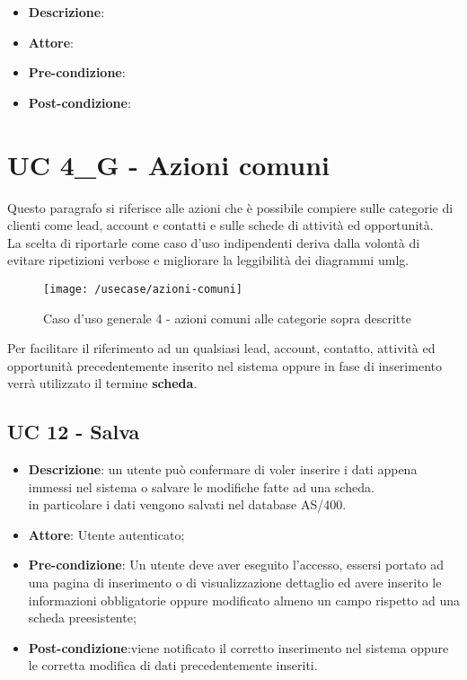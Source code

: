 \begin{itemize}
	\item \textbf{Descrizione}: %
	\item \textbf{Attore}: 
	\item \textbf{Pre-condizione}:
	\item \textbf{Post-condizione}:
\end{itemize}

\newpage

\section{UC 4\_G - Azioni comuni}

Questo paragrafo si riferisce alle azioni che è possibile compiere sulle categorie di clienti come lead, account e contatti e sulle schede di attività ed opportunità.\\
La scelta di riportarle come caso d'uso indipendenti deriva dalla volontà di evitare ripetizioni verbose e migliorare la leggibilità dei diagrammi \gls{umlg}.\\
\begin{figure}[h]
	\centering
	\texttt{[image: /usecase/azioni-comuni]}
	\caption{Caso d'uso generale 4 - azioni comuni alle categorie sopra descritte}
\end{figure}
Per facilitare il riferimento ad un qualsiasi lead, account, contatto, attività ed opportunità precedentemente inserito nel sistema oppure in fase di inserimento verrà utilizzato il termine \textbf{scheda}.
\subsection{UC 12 - Salva}

\begin{itemize}
	\item \textbf{Descrizione}: un utente può confermare di voler inserire i dati appena immessi nel sistema o salvare le modifiche fatte ad una scheda. \\
	 in particolare i dati vengono salvati nel database AS/400.
	\item \textbf{Attore}: Utente autenticato;
	\item \textbf{Pre-condizione}: Un utente deve aver eseguito l'accesso, essersi portato ad una pagina di inserimento o di visualizzazione dettaglio ed avere inserito le informazioni obbligatorie oppure modificato almeno un campo rispetto ad una scheda preesistente;
	\item \textbf{Post-condizione}:viene notificato il corretto inserimento nel sistema oppure le corretta modifica di dati precedentemente inseriti.
\end{itemize}

